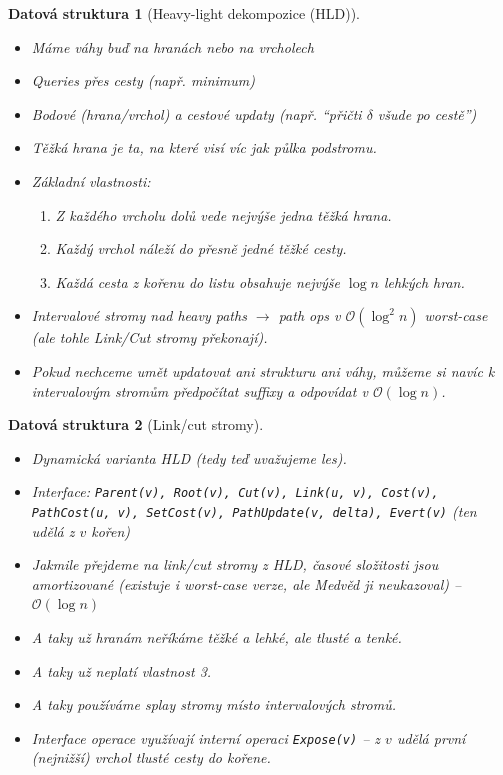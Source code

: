 \documentclass{article}
\theoremstyle{noparens}
\newtheorem*{ds}{Datová struktura}
\theoremstyle{noparens-mys}
\theoremstyle{noparens-note}
\newcommand{\OO}{\mathcal{O}}
\begin{document}
\begin{ds}[Heavy-light dekompozice (HLD)]
    ~

    \begin{itemize}
        \item Máme váhy buď na hranách nebo na vrcholech
        \item Queries přes cesty (např. minimum)
        \item Bodové (hrana/vrchol) a cestové updaty (např. \enquote{přičti
            $\delta$ všude po cestě})
        \item \emph{Těžká hrana} je ta, na které visí víc jak půlka podstromu.
        \item Základní vlastnosti:
            \begin{enumerate}
                \item Z každého vrcholu dolů vede nejvýše jedna těžká hrana.
                \item Každý vrchol náleží do přesně jedné těžké cesty.
                \item Každá cesta z kořenu do listu obsahuje nejvýše $\log n$
                    lehkých hran.
            \end{enumerate}
        \item Intervalové stromy nad heavy paths $\rightarrow$ path ops v
            $\OO(\log^2 n)$ worst-case (ale tohle Link/Cut stromy překonají).
        \item Pokud nechceme umět updatovat ani strukturu ani váhy,
            můžeme si navíc k intervalovým stromům předpočítat suffixy a
            odpovídat v $\OO(\log n)$.
    \end{itemize}
\end{ds}

\begin{ds}[Link/cut stromy]
    ~

    \begin{itemize}
        \item Dynamická varianta HLD (tedy teď uvažujeme les).
        \item Interface: \texttt{Parent(v), Root(v), Cut(v), Link(u, v),
            Cost(v), PathCost(u, v), SetCost(v), PathUpdate(v, delta),
            Evert(v)} (ten udělá z $v$ kořen)
        \item Jakmile přejdeme na link/cut stromy z HLD, časové složitosti jsou
            amortizované (existuje i worst-case verze, ale Medvěd ji
            neukazoval) -- $\OO(\log n)$
        \item A taky už hranám neříkáme těžké a lehké, ale tlusté a tenké.
        \item A taky už neplatí vlastnost 3.
        \item A taky používáme splay stromy místo intervalových stromů.
        \item Interface operace využívají interní operaci \texttt{Expose(v)} --
            z $v$ udělá první (nejnižší) vrchol tlusté cesty do kořene.
    \end{itemize}
\end{ds}
\end{document}
